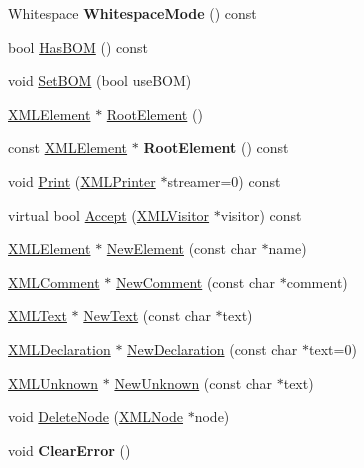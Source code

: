 \begin{DoxyCompactItemize}
\item 
Whitespace {\bfseries Whitespace\+Mode} () const \hypertarget{classtinyxml2_1_1XMLDocument_a94b3ea2f77c9ac831723984df5a02d01}{}\label{classtinyxml2_1_1XMLDocument_a94b3ea2f77c9ac831723984df5a02d01}

\item 
bool \hyperlink{classtinyxml2_1_1XMLDocument_a530649e9de7e5aa8df9c37f66197fcb6}{Has\+B\+OM} () const 
\item 
void \hyperlink{classtinyxml2_1_1XMLDocument_a14419b698f7c4b140df4e80f3f0c93b0}{Set\+B\+OM} (bool use\+B\+OM)
\item 
\hyperlink{classtinyxml2_1_1XMLElement}{X\+M\+L\+Element} $\ast$ \hyperlink{classtinyxml2_1_1XMLDocument_ad2b70320d3c2a071c2f36928edff3e1c}{Root\+Element} ()
\item 
const \hyperlink{classtinyxml2_1_1XMLElement}{X\+M\+L\+Element} $\ast$ {\bfseries Root\+Element} () const \hypertarget{classtinyxml2_1_1XMLDocument_a23a25b573d2adf3ee6075636c2a31c73}{}\label{classtinyxml2_1_1XMLDocument_a23a25b573d2adf3ee6075636c2a31c73}

\item 
void \hyperlink{classtinyxml2_1_1XMLDocument_a686ea28672c0e0c60383ec28148c1ac0}{Print} (\hyperlink{classtinyxml2_1_1XMLPrinter}{X\+M\+L\+Printer} $\ast$streamer=0) const 
\item 
virtual bool \hyperlink{classtinyxml2_1_1XMLDocument_aa08503d24898bf9992ae5e5fb8b0cf87}{Accept} (\hyperlink{classtinyxml2_1_1XMLVisitor}{X\+M\+L\+Visitor} $\ast$visitor) const 
\item 
\hyperlink{classtinyxml2_1_1XMLElement}{X\+M\+L\+Element} $\ast$ \hyperlink{classtinyxml2_1_1XMLDocument_a3c335a700a43d7c363a393142a23f234}{New\+Element} (const char $\ast$name)
\item 
\hyperlink{classtinyxml2_1_1XMLComment}{X\+M\+L\+Comment} $\ast$ \hyperlink{classtinyxml2_1_1XMLDocument_a386df0befd06aadb5e0cd21381aa955a}{New\+Comment} (const char $\ast$comment)
\item 
\hyperlink{classtinyxml2_1_1XMLText}{X\+M\+L\+Text} $\ast$ \hyperlink{classtinyxml2_1_1XMLDocument_acece5de77a0819f2341b08c1e1ed9987}{New\+Text} (const char $\ast$text)
\item 
\hyperlink{classtinyxml2_1_1XMLDeclaration}{X\+M\+L\+Declaration} $\ast$ \hyperlink{classtinyxml2_1_1XMLDocument_ae519030c0262fa2daff8993681990e16}{New\+Declaration} (const char $\ast$text=0)
\item 
\hyperlink{classtinyxml2_1_1XMLUnknown}{X\+M\+L\+Unknown} $\ast$ \hyperlink{classtinyxml2_1_1XMLDocument_a4954f502c5fd7f49de54c3c0c99bb73d}{New\+Unknown} (const char $\ast$text)
\item 
void \hyperlink{classtinyxml2_1_1XMLDocument_ac1d6e2c7fcc1a660624ac4f68e96380d}{Delete\+Node} (\hyperlink{classtinyxml2_1_1XMLNode}{X\+M\+L\+Node} $\ast$node)
\item 
void {\bfseries Clear\+Error} ()\hypertarget{classtinyxml2_1_1XMLDocument_a4085d9c52f1d93214311459d6d1fcf17}{}\label{classtinyxml2_1_1XMLDocument_a4085d9c52f1d93214311459d6d1fcf17}


\end{DoxyCompactItemize}
